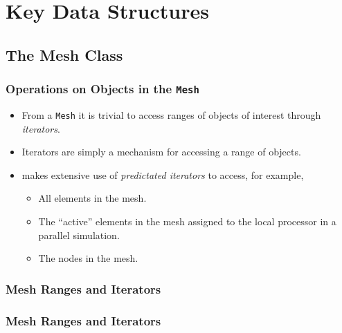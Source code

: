 \section{Key Data Structures}

\subsection{The Mesh Class}

\begin{frame}
  \frametitle{Operations on Objects in the \texttt{Mesh}}
  \begin{block}{}
    \begin{itemize}
    \item From a \texttt{Mesh} it is trivial to access ranges of objects of interest through \emph{iterators}.
    \item Iterators are simply a mechanism for accessing a range of objects.
    \item \libMesh{} makes extensive use of \emph{predictated iterators} to access, for example,
      \begin{itemize}
        \item All elements in the mesh.
        \item The ``active'' elements in the mesh assigned to the local processor in a parallel simulation.
        \item The nodes in the mesh.
      \end{itemize}
  \end{itemize}
  \end{block}
\end{frame}

\begin{frame}[shrink]
  \frametitle{Mesh Ranges and Iterators}
  
\end{frame}

\begin{frame}[shrink]
  \frametitle{Mesh Ranges and Iterators}
  
\end{frame}



